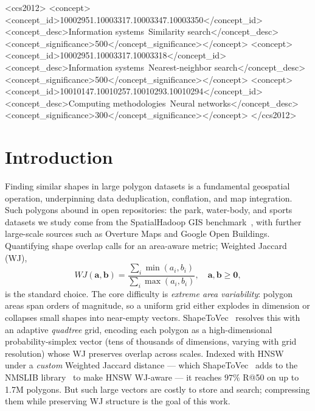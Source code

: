 \documentclass[sigconf]{acmart}
\begin{document}
\begin{CCSXML}
<ccs2012>
<concept><concept_id>10002951.10003317.10003347.10003350</concept_id>
<concept_desc>Information systems~Similarity search</concept_desc>
<concept_significance>500</concept_significance></concept>
<concept><concept_id>10002951.10003317.10003318</concept_id>
<concept_desc>Information systems~Nearest-neighbor search</concept_desc>
<concept_significance>500</concept_significance></concept>
<concept><concept_id>10010147.10010257.10010293.10010294</concept_id>
<concept_desc>Computing methodologies~Neural networks</concept_desc>
<concept_significance>300</concept_significance></concept>
</ccs2012>
\end{CCSXML}
\maketitle

\section{Introduction}
\label{sec:intro}
Finding similar shapes in large polygon datasets is a fundamental geospatial
operation, underpinning data deduplication, conflation, and map integration. Such
polygons abound in open repositories: the park, water-body, and sports datasets we
study come from the SpatialHadoop GIS benchmark~\cite{eldawy15}, with further
large-scale sources such as Overture Maps and Google Open Buildings. Quantifying
shape overlap calls for an area-aware metric; Weighted Jaccard (WJ),
\begin{equation}
  WJ(\mathbf{a},\mathbf{b}) = \frac{\sum_i \min(a_i,b_i)}{\sum_i \max(a_i,b_i)},
  \quad \mathbf{a},\mathbf{b} \ge \mathbf{0},
  \label{eq:wj}
\end{equation}
is the standard choice. The core difficulty is
\emph{extreme area variability}: polygon areas span orders of magnitude, so a
uniform grid either explodes in dimension or collapses small shapes into
near-empty vectors. ShapeToVec~\cite{shape2vec} resolves this with an adaptive
\emph{quadtree} grid, encoding each polygon as a high-dimensional probability-simplex
vector (tens of thousands of dimensions, varying with grid resolution) whose WJ
preserves overlap across scales. Indexed with HNSW~\cite{hnsw20} under a \emph{custom}
Weighted Jaccard distance --- which ShapeToVec~\cite{shape2vec} adds to the NMSLIB
library~\cite{boytsov13} to make HNSW WJ-aware --- it reaches $97\%$ R@50
on up to 1.7M polygons. But such large vectors are costly to store and search;
compressing them while preserving WJ structure is the goal of this work.
\end{document}
